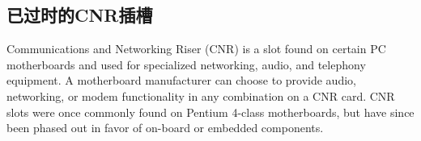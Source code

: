\subsection{已过时的CNR插槽}
Communications and Networking Riser (CNR) is a slot found on certain PC motherboards and used for specialized networking, audio, and telephony equipment. A motherboard manufacturer can choose to provide audio, networking, or modem functionality in any combination on a CNR card. CNR slots were once commonly found on Pentium 4-class motherboards, but have since been phased out in favor of on-board or embedded components.














